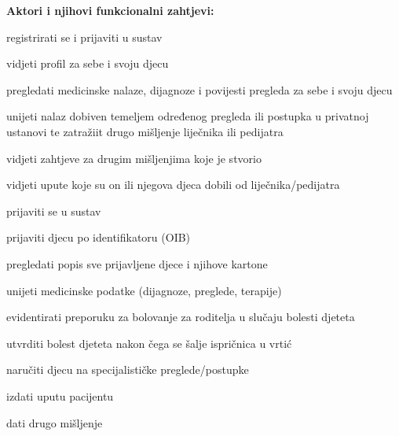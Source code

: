 			\noindent \textbf{Aktori i njihovi funkcionalni zahtjevi:}
			\begin{packed_enum}
				\item  {}
				\begin{packed_enum}
					\item registrirati se i prijaviti u sustav
                    \item vidjeti profil za sebe i svoju djecu
					\item pregledati medicinske nalaze, dijagnoze i povijesti pregleda za sebe i svoju djecu
					\item unijeti nalaz dobiven temeljem određenog pregleda ili postupka u privatnoj ustanovi te zatražiit drugo mišljenje liječnika ili pedijatra
                    \item vidjeti zahtjeve za drugim mišljenjima koje je stvorio
                    \item vidjeti upute koje su on ili njegova djeca dobili od liječnika/pedijatra
				\end{packed_enum}
			
				\item  {}
				\begin{packed_enum}
					\item prijaviti se u sustav
                    \item prijaviti djecu po identifikatoru (OIB)
                    \item pregledati popis sve prijavljene djece i njihove kartone
					\item unijeti medicinske podatke (dijagnoze, preglede, terapije)
                    \item evidentirati preporuku za bolovanje za roditelja u slučaju bolesti djeteta
                    \item utvrditi bolest djeteta nakon čega se šalje ispričnica u vrtić
                    \item naručiti djecu na specijalističke preglede/postupke
                    \item izdati uputu pacijentu
                    \item dati drugo mišljenje
				\end{packed_enum}


\end{packed_enum}
